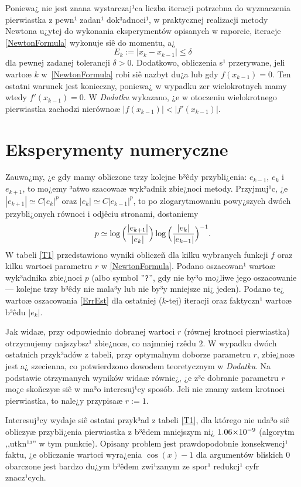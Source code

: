 \documentclass[a4paper,12pt]{article}
\newcommand{\razy}{\hspace{-0.5ex}\times\hspace{-0.5ex}}
\begin{document}
Poniewa¿ nie jest znana wystarczaj¹ca liczba iteracji potrzebna do wyznaczenia
pierwiastka z pewn¹ zadan¹ dok³adnoci¹, w praktycznej realizacji metody Newtona
u¿ytej do wykonania eksperymentów opisanych w raporcie, iteracje \eqref{NewtonFormula}
wykonuje siê do momentu, a¿
\begin{equation}
\label{ErrEst}
  E_k := |x_k - x_{k-1}| \leq \delta
\end{equation}
dla pewnej zadanej tolerancji $\delta > 0$. Dodatkowo, obliczenia s¹ przerywane,
jeli wartoæ $k$ w~\eqref{NewtonFormula} robi siê nazbyt du¿a lub gdy $f(x_{k-1}) = 0$.
Ten ostatni warunek jest konieczny, poniewa¿ w wypadku zer wielokrotnych mamy
wtedy $f'(x_{k-1}) = 0$. W \emph{Dodatku} wykazano, ¿e w otoczeniu wielokrotnego
pierwiastka zachodzi nierównoæ $|f(x_{k-1})| < |f'(x_{k-1})|$.


\section*{Eksperymenty numeryczne}
Zauwa¿my, ¿e gdy mamy obliczone trzy kolejne b³êdy przybli¿enia:
$e_{k-1}$, $e_{k}$ i $e_{k+1}$, to mo¿emy ³atwo szacowaæ wyk³adnik zbie¿noci metody.
Przyjmuj¹c, ¿e $|e_{k+1}| \simeq C |e_{k}|^p$ oraz $|e_k| \simeq C |e_{k-1}|^p$,
to po zlogarytmowaniu powy¿szych dwóch przybli¿onych równoci i odjêciu stronami,
dostaniemy
$$
  p \simeq \log\Big(\frac{|e_{k+1}|}{|e_k|}\Big)
           \log\Big(\frac{|e_{k}|}{|e_{k-1}|}\Big)^{-1}.
\vspace{1ex}
$$
W tabeli \ref{T1} przedstawiono wyniki obliczeñ dla kilku wybranych funkcji $f$ oraz
kilku wartoci parametru $r$ w \eqref{NewtonFormula}. Podano oszacowan¹ wartoæ
wyk³adnika zbie¿noci $p$ (albo symbol ''\verb;?;'', gdy nie by³o mo¿liwe jego
oszacowanie --- kolejne trzy b³êdy nie mala³y lub nie by³y mniejsze ni¿ jeden).
Podano te¿ wartoæ oszacowania \eqref{ErrEst} dla ostatniej ($k$-tej)
iteracji oraz faktyczn¹ wartoæ b³êdu $|e_k|$.

Jak widaæ, przy odpowiednio dobranej wartoci $r$ (równej krotnoci pierwiastka)
otrzymujemy najszybsz¹ zbie¿noæ, co najmniej rzêdu $2$. W wypadku dwóch ostatnich
przyk³adów z tabeli, przy optymalnym doborze parametru $r$, zbie¿noæ jest a¿ szecienna,
co potwierdzono dowodem teoretycznym w \emph{Dodatku}. Na podstawie otrzymanych wyników widaæ
równie¿, ¿e z³e dobranie parametru $r$ mo¿e skoñczyæ siê w ma³o interesuj¹cy sposób.
Jeli nie znamy zatem krotnoci pierwiastka, to nale¿y przypisaæ $r:=1$.

Interesuj¹cy wydaje siê ostatni przyk³ad z tabeli \ref{T1}, dla którego nie uda³o
siê obliczyæ przybli¿enia pierwiastka z b³êdem mniejszym ni¿ $1.06\razy10^{-9}$ (algorytm
,,utkn¹³'' w tym punkcie). Opisany problem jest prawdopodobnie konsekwencj¹ faktu,
¿e obliczanie wartoci wyra¿enia $\cos(x) - 1$ dla argumentów bliskich $0$ obarczone
jest bardzo du¿ym b³êdem zwi¹zanym ze spor¹ redukcj¹ cyfr znacz¹cych.
\end{document}
